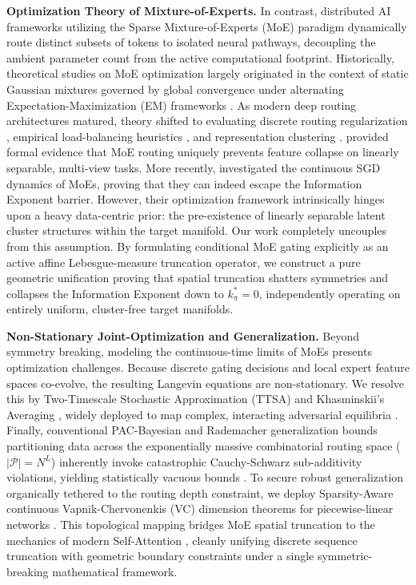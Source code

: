 \documentclass{article}
\newcommand{\1}{\mathbb{I}}
\newcommand{\calP}{\mathcal{P}}
\begin{document}
\textbf{Optimization Theory of Mixture-of-Experts.} In contrast, distributed AI frameworks utilizing the Sparse Mixture-of-Experts (MoE) \citep{shazeer2017outrageously, jiang2024mixtral, deepseek2024v3} paradigm dynamically route distinct subsets of tokens to isolated neural pathways, decoupling the ambient parameter count from the active computational footprint. Historically, theoretical studies on MoE optimization largely originated in the context of static Gaussian mixtures governed by global convergence under alternating Expectation-Maximization (EM) frameworks \citep{ho2022convergence, jordan1994hierarchical, jacobs1991adaptive}. As modern deep routing architectures matured, theory shifted to evaluating discrete routing regularization \citep{hazimeh2021dselect}, empirical load-balancing heuristics \citep{zhou2022mixture, fedus2022switch}, and representation clustering \citep{chen2022towards}. \cite{chen2022towards} provided formal evidence that MoE routing uniquely prevents feature collapse on linearly separable, multi-view tasks. More recently, \cite{kawata2025mixture} investigated the continuous SGD dynamics of MoEs, proving that they can indeed escape the Information Exponent barrier. However, their optimization framework intrinsically hinges upon a heavy data-centric prior: the pre-existence of linearly separable latent cluster structures within the target manifold. Our work completely uncouples from this assumption. By formulating conditional MoE gating explicitly as an active affine Lebesgue-measure truncation operator, we construct a pure geometric unification proving that spatial truncation shatters symmetries and collapses the Information Exponent down to $k^*_\pi=0$, independently operating on entirely uniform, cluster-free target manifolds.

\textbf{Non-Stationary Joint-Optimization and Generalization.} Beyond symmetry breaking, modeling the continuous-time limits of MoEs presents optimization challenges. Because discrete gating decisions and local expert feature spaces co-evolve, the resulting Langevin equations are non-stationary. We resolve this by Two-Timescale Stochastic Approximation (TTSA) and Khasminskii's Averaging \citep{khasminskii1966stochastic, borkar1997stochastic}, widely deployed to map complex, interacting adversarial equilibria \citep{heusel2017gans}. Finally, conventional PAC-Bayesian and Rademacher generalization bounds partitioning data across the exponentially massive combinatorial routing space ($|\calP| = N^L$) inherently invoke catastrophic Cauchy-Schwarz sub-additivity violations, yielding statistically vacuous bounds \citep{dziugaite2017computing}. To secure robust generalization organically tethered to the routing depth constraint, we deploy Sparsity-Aware continuous Vapnik-Chervonenkis (VC) dimension theorems for piecewise-linear networks \citep{bartlett2019nearly}. This topological mapping bridges MoE spatial truncation to the mechanics of modern Self-Attention \citep{vaswani2017attention, edelman2022inductive}, cleanly unifying discrete sequence truncation with geometric boundary constraints under a single symmetric-breaking mathematical framework.
\end{document}
